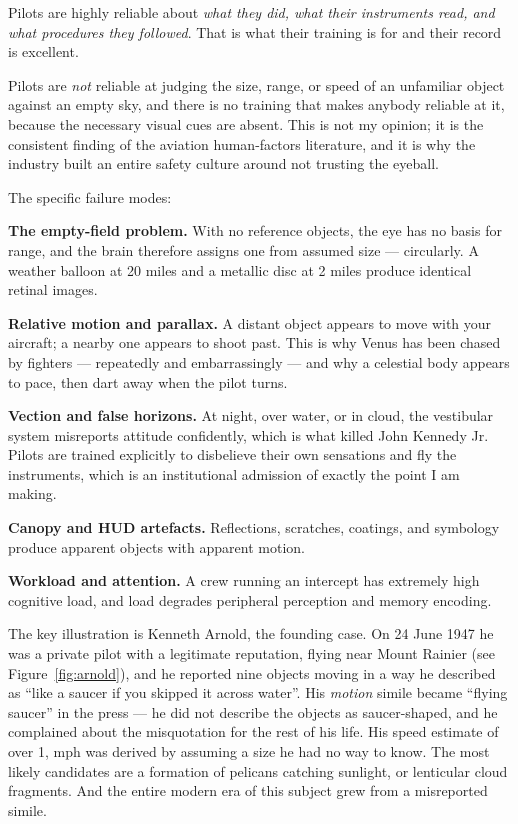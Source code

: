 Pilots are highly reliable about \emph{what they did, what their instruments read, and what
procedures they followed}. That is what their training is for and their record is excellent.

Pilots are \emph{not} reliable at judging the size, range, or speed of an unfamiliar object
against an empty sky, and there is no training that makes anybody reliable at it, because the
necessary visual cues are absent. This is not my opinion; it is the consistent finding of the
aviation human-factors literature, and it is why the industry built an entire safety culture
around not trusting the eyeball.

The specific failure modes:

\textbf{The empty-field problem.} With no reference objects, the eye has no basis for range, and
the brain therefore assigns one from assumed size --- circularly. A weather balloon at 20 miles
and a metallic disc at 2 miles produce identical retinal images.

\textbf{Relative motion and parallax.} A distant object appears to move with your aircraft; a
nearby one appears to shoot past. This is why Venus has been chased by fighters --- repeatedly and
embarrassingly --- and why a celestial body appears to pace, then dart away when the pilot turns.

\textbf{Vection and false horizons.} At night, over water, or in cloud, the vestibular system
misreports attitude confidently, which is what killed John Kennedy Jr. Pilots are trained
explicitly to disbelieve their own sensations and fly the instruments, which is an institutional
admission of exactly the point I am making.

\textbf{Canopy and HUD artefacts.} Reflections, scratches, coatings, and symbology produce
apparent objects with apparent motion.

\textbf{Workload and attention.} A crew running an intercept has extremely high cognitive load,
and load degrades peripheral perception and memory encoding.

The key illustration is Kenneth Arnold, the founding case. On 24 June 1947 he was a private pilot
with a legitimate reputation, flying near Mount Rainier (see Figure~\ref{fig:arnold}), and he reported nine objects moving in a
way he described as ``like a saucer if you skipped it across water''. His \emph{motion} simile
became ``flying saucer'' in the press --- he did not describe the objects as saucer-shaped, and
he complained about the misquotation for the rest of his life. His speed estimate of over 1,
mph was derived by assuming a size he had no way to know. The most likely candidates are a
formation of pelicans catching sunlight, or lenticular cloud fragments. And the entire modern era
of this subject grew from a misreported simile.

